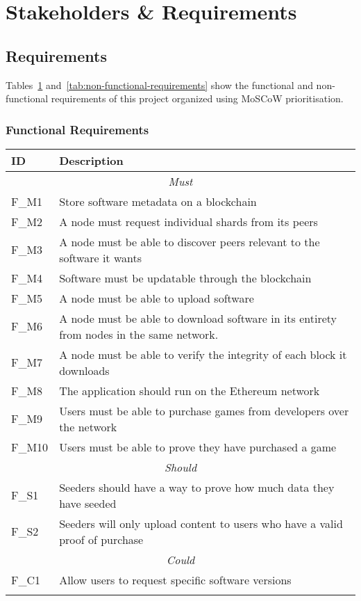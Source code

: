 
\section{Stakeholders \& Requirements}



\subsection{Requirements}

Tables~\ref{tab:functional-requirements} and~\ref{tab:non-functional-requirements} show the functional and non-functional requirements of this project organized using MoSCoW prioritisation. 

\subsubsection*{Functional Requirements}

\begin{longtable}{ p{} p{} }
  \toprule
  \textbf{ID} & \textbf{Description}
  \\\midrule\midrule
  \multicolumn{2}{c}{\cellcolor{red!70}\textit{Must}}\\\midrule
  F\_M1 & Store software metadata on a blockchain\\
  F\_M2 & A node must request individual shards from its peers\\
  F\_M3 & A node must be able to discover peers relevant to the software it wants\\
  F\_M4 & Software must be updatable through the blockchain\\
  F\_M5 & A node must be able to upload software\\
  F\_M6 & A node must be able to download software in its entirety from nodes in the same network.\\
  F\_M7 & A node must be able to verify the integrity of each block it downloads\\
  F\_M8 & The application should run on the Ethereum network\\
  F\_M9 & Users must be able to purchase games from developers over the network\\
  F\_M10 & Users must be able to prove they have purchased a game\\
  \midrule\multicolumn{2}{c}{\cellcolor{orange!70}\textit{Should}}\\\midrule
  F\_S1 & Seeders should have a way to prove how much data they have seeded\\
  F\_S2 & Seeders will only upload content to users who have a valid proof of purchase\\
  \midrule\multicolumn{2}{c}{\cellcolor{green}\textit{Could}}\\\midrule
  F\_C1 & Allow users to request specific software versions\\
  \midrule
  \bottomrule
  \label{tab:functional-requirements}
\end{longtable}

